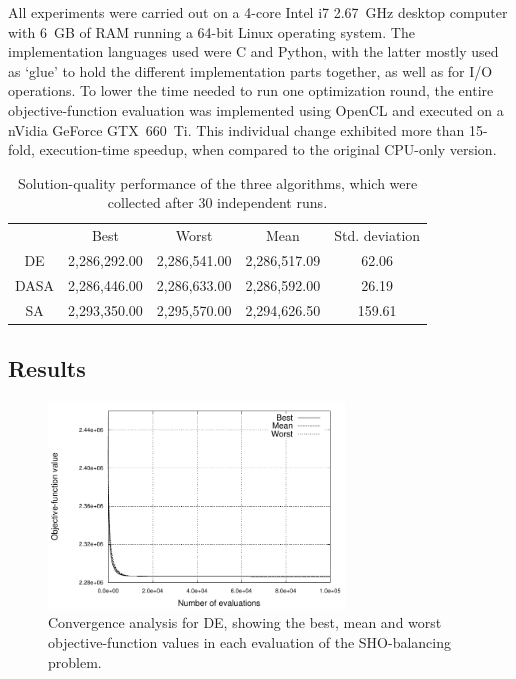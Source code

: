 All experiments were carried out on a 4-core Intel i7 2.67~GHz desktop
computer with 6~GB of RAM running a 64-bit Linux operating system.
The implementation languages used were C and Python, with the latter
mostly used as \textquoteleft{}glue\textquoteright{} to hold the different
implementation parts together, as well as for I/O operations. To lower
the time needed to run one optimization round, the entire objective-function
evaluation was implemented using OpenCL and executed on a nVidia GeForce
GTX~660~Ti. This individual change exhibited more than 15-fold,
execution-time speedup, when compared to the original CPU-only version.

\begin{table}
\centering

\caption{Solution-quality performance of the three algorithms, which were collected
after 30 independent runs\textit{\emph{.}}\textit{\label{tab:07-Algorithm_performance}}}


\begin{tabular}{ccccc}
\cmidrule{2-5} 
 & Best & Worst & Mean & Std. deviation\tabularnewline\addlinespace
\midrule
DE & 2,286,292.00 & 2,286,541.00 & 2,286,517.09 & 62.06\tabularnewline
DASA & 2,286,446.00 & 2,286,633.00 & 2,286,592.00 & 26.19\tabularnewline
SA  & 2,293,350.00 & 2,295,570.00 & 2,294,626.50 & 159.61\tabularnewline
\bottomrule
\end{tabular}
\end{table}



\subsection{Results \label{sub:07-Results}}

\begin{figure}
\centering

\includegraphics[width=0.7\textwidth]{07-experimental_evaluation-sho_balancing/img/DE_convergence}

\caption{Convergence analysis for DE, showing the best, mean and worst objective-function
values in each evaluation of the SHO-balancing problem.\label{fig:07-Algorithm_convergence-DE}}
\end{figure}



